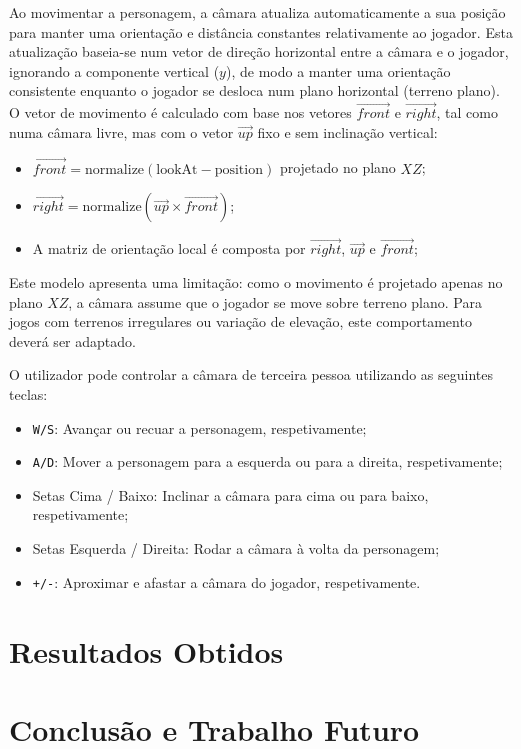 \documentclass[12pt, a4paper]{article}
\begin{document}
Ao movimentar a personagem, a câmara atualiza automaticamente a sua posição para manter uma
orientação e distância constantes relativamente ao jogador. Esta atualização baseia-se num vetor
de direção horizontal entre a câmara e o jogador, ignorando a componente vertical ($y$), de modo a
manter uma orientação consistente enquanto o jogador se desloca num plano horizontal (terreno
plano). O vetor de movimento é calculado com base nos vetores $\vec{front}$ e $\vec{right}$, tal
como numa câmara livre, mas com o vetor $\vec{up}$ fixo e sem inclinação vertical:

\begin{itemize}
    \item $\vec{front} = \text{normalize}( \text{lookAt} - \text{position} )$ projetado no plano
    $XZ$;
    \item $\vec{right} = \text{normalize}( \vec{up} \times \vec{front} )$;
    \item A matriz de orientação local é composta por $\vec{right}$, $\vec{up}$ e $\vec{front}$;
\end{itemize}

Este modelo apresenta uma limitação: como o movimento é projetado apenas no plano $XZ$, a
câmara assume que o jogador se move sobre terreno plano. Para jogos com terrenos irregulares ou
variação de elevação, este comportamento deverá ser adaptado.

O utilizador pode controlar a câmara de terceira pessoa utilizando as seguintes teclas:

\begin{itemize}
    \item \texttt{W/S}: Avançar ou recuar a personagem, respetivamente;
    \item \texttt{A/D}: Mover a personagem para a esquerda ou para a direita, respetivamente;
    \item Setas Cima / Baixo: Inclinar a câmara para cima ou para baixo, respetivamente;
    \item Setas Esquerda / Direita: Rodar a câmara à volta da personagem;
    \item \texttt{+/-}: Aproximar e afastar a câmara do jogador, respetivamente.
\end{itemize}

\section{Resultados Obtidos}

\section{Conclusão e Trabalho Futuro}
\end{document}
